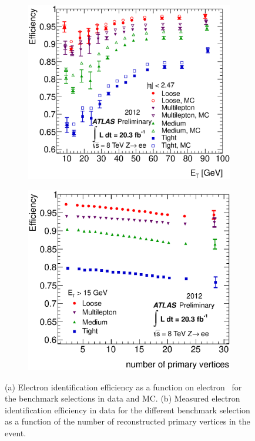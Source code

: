 \begin{figure}[tb!]
\centering
\begin{subfigure}[b]{0.49\textwidth}
\includegraphics[width=\textwidth]{Objects/Figures/Fig5a_electronid_et.eps}
\caption{}
\end{subfigure}
\begin{subfigure}[b]{0.49\textwidth}
\includegraphics[width=\textwidth]{Objects/Figures/Fig7a_electronid_npv.eps}
\caption{}
\end{subfigure}
\caption{ (a) Electron identification efficiency as a function on electron \ET\ for the benchmark selections in data and MC. 
(b) Measured electron identification efficiency in data for the different benchmark selection as a function of the number of reconstructed primary vertices in the event. 
}
\label{fig:OBeleID}
\end{figure} 

